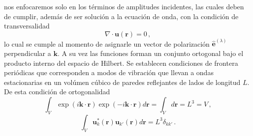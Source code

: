 nos enfocaremos solo en los términos de amplitudes incidentes, las cuales deben de cumplir, además de ser solución a la ecuación de onda, con la condición de transversalidad
\begin{equation}
  \label{EM.13}
  \nabla \cdot \mathbf{u}(\mathbf{r}) = 0 \,,
\end{equation}
lo cual se cumple al momento de asignarle un vector de polarización $\mathbf{\hat{e}}^{(\lambda)}$ perpendicular a $\mathbf{k}$. A su vez las funciones forman un conjunto ortogonal bajo el producto interno del espacio de Hilbert. Se establecen condiciones de frontera periódicas que corresponden a modos de vibración que llevan a ondas estacionarias en un volúmen cúbico de paredes reflejantes de lados de longitud $L$. De esta condición de ortogonalidad
\begin{equation*}
  \int_V \exp{(i\mathbf{k}\cdot\mathbf{r})} \exp{(-i\mathbf{k}\cdot\mathbf{r})} d\mathbf{r}
  =  \int_V d\mathbf{r}
  =  L^3 = V \,,
\end{equation*}
\begin{equation}
  \label{EM.14}
  \int_V \mathbf{u}^{*}_k(\mathbf{r}) \mathbf{u}_{k'}(\mathbf{r}) d\mathbf{r} = L^3\delta_{kk'} \,.
\end{equation}


